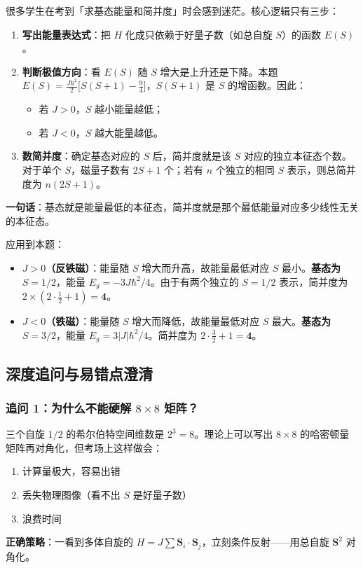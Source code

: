 \begin{insightbox}[求基态与简并度的通用思路]
很多学生在考到「求基态能量和简并度」时会感到迷茫。核心逻辑只有三步：
\begin{enumerate}[nosep]
    \item \textbf{写出能量表达式}：把 $H$ 化成只依赖于好量子数（如总自旋 $S$）的函数 $E(S)$。
    \item \textbf{判断极值方向}：看 $E(S)$ 随 $S$ 增大是上升还是下降。本题 $E(S) = \frac{J\hbar^2}{2}\bigl[S(S+1) - \frac{9}{4}\bigr]$，$S(S+1)$ 是 $S$ 的增函数。因此：
    \begin{itemize}[nosep]
        \item 若 $J>0$，$S$ 越小能量越低；
        \item 若 $J<0$，$S$ 越大能量越低。
    \end{itemize}
    \item \textbf{数简并度}：确定基态对应的 $S$ 后，简并度就是该 $S$ 对应的独立本征态个数。对于单个 $S$，磁量子数有 $2S+1$ 个；若有 $n$ 个独立的相同 $S$ 表示，则总简并度为 $n(2S+1)$。
\end{enumerate}
\textbf{一句话}：基态就是能量最低的本征态，简并度就是那个最低能量对应多少线性无关的本征态。
\end{insightbox}

应用到本题：
\begin{itemize}[nosep]
    \item \textbf{$J > 0$（反铁磁）}：能量随 $S$ 增大而升高，故能量最低对应 $S$ 最小。\textbf{基态为 $S=1/2$}，能量 $E_g = -3J\hbar^2/4$。由于有两个独立的 $S=1/2$ 表示，简并度为 $2 \times (2\cdot\frac{1}{2}+1) = \textbf{4}$。
    \item \textbf{$J < 0$（铁磁）}：能量随 $S$ 增大而降低，故能量最低对应 $S$ 最大。\textbf{基态为 $S=3/2$}，能量 $E_g = 3|J|\hbar^2/4$。简并度为 $2\cdot\frac{3}{2}+1 = \textbf{4}$。
\end{itemize}

\subsection{深度追问与易错点澄清}

\subsubsection*{追问 1：为什么不能硬解 $8\times 8$ 矩阵？}

三个自旋 $1/2$ 的希尔伯特空间维数是 $2^3 = 8$。理论上可以写出 $8\times 8$ 的哈密顿量矩阵再对角化，但考场上这样做会：
\begin{enumerate}[nosep]
    \item 计算量极大，容易出错
    \item 丢失物理图像（看不出 $S$ 是好量子数）
    \item 浪费时间
\end{enumerate}
\textbf{正确策略}：一看到多体自旋的 $H = J\sum \bm{S}_i \cdot \bm{S}_j$，立刻条件反射——用总自旋 $\bm{S}^2$ 对角化。

